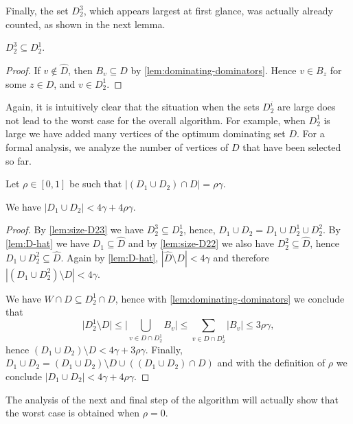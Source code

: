 Finally, the set $D_2^3$, which appears largest at first glance, was
actually already counted, as shown in the next lemma.
\begin{lemma}\label{lem:size-D23}
  $D_2^3\subseteq D_2^1$.
\end{lemma}
\begin{proof}
  If $v\not\in \hat{D}$, then $B_v\subseteq D$ by
  \cref{lem:dominating-dominators}.  Hence $v\in B_z$ for some
  $z\in D$, and $v\in D_2^1$.
\end{proof}

Again, it is intuitively clear that the situation when the sets
$D_2^i$ are large does not lead to the worst case for the overall
algorithm. For example, when $D_2^1$ is large we have added many
vertices of the optimum dominating set $D$. For a formal analysis, we
analyze the number of vertices of $D$ that have been selected so far.

\begin{tcolorbox}
  Let $\rho\in [0,1]$ be such that $|(D_1 \cup D_2)\cap D| =\rho\gamma$.
\end{tcolorbox}

%


\smallskip
\begin{lemma}\label{lem:size-D12}
  We have $|D_1\cup D_2| < 4\gamma+4\rho\gamma$.
\end{lemma}
\begin{proof}
  By \cref{lem:size-D23} we have $D_2^3\subseteq D_2^1$, hence,
  $D_1\cup D_2=D_1\cup D_2^1\cup D_2^2$. By \cref{lem:D-hat} we have
  $D_1 \subseteq \hat D$ and by \cref{lem:size-D22} we also have
  $D_2^2 \subseteq \hat D$, hence $D_1\cup D_2^2\subseteq \hat D$.
  Again by \cref{lem:D-hat}, $|\hat D \setminus D|<4\gamma$ and
  therefore $|(D_1 \cup D_2^2 )\setminus D| < 4 \gamma$.

  We have $W\cap D\subseteq D_2^1\cap D$, hence with
  \cref{lem:dominating-dominators} we conclude that
  \[
    \big\vert D_2^1 \setminus D \big\vert \leq
    \Big\vert\bigcup\limits_{v\in D \cap D_2^1}B_v\Big\vert \leq
    \sum\limits_{v\in D \cap D_2^1} |B_v| \leq 3\rho\gamma,
  \]
  hence $(D_1\cup D_2)\setminus D<4\gamma+3\rho\gamma$. Finally,
  $D_1\cup D_2=(D_1\cup D_2)\setminus D\cup ((D_1\cup D_2)\cap D)$ and
  with the definition of $\rho$ we conclude
  $|D_1\cup D_2|<4\gamma + 4\rho\gamma$.
\end{proof}
The analysis of the next and final step of the algorithm will actually
show that the worst case is obtained when $\rho=0$.

